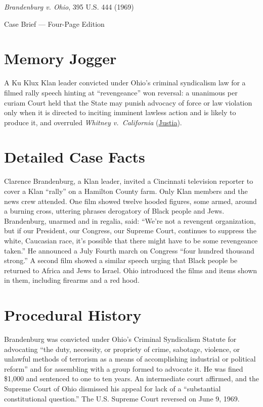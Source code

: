 \documentclass[12pt]{article}
\begin{document}
\begin{center}
{\LARGE \textit{Brandenburg v. Ohio}, 395 U.S. 444 (1969)\par}
\vspace{0.8em}
{\large Case Brief --- Four-Page Edition\par}
\end{center}
\vspace{1em}

\section{Memory Jogger}

A Ku Klux Klan leader convicted under Ohio's criminal syndicalism law for a filmed rally speech hinting at ``revengeance'' won reversal: a unanimous per curiam Court held that the State may punish advocacy of force or law violation only when it is directed to inciting imminent lawless action and is likely to produce it, and overruled \textit{Whitney v.\ California} (\href{https://supreme.justia.com/cases/federal/us/395/444/}{Justia}).

\section{Detailed Case Facts}

Clarence Brandenburg, a Klan leader, invited a Cincinnati television reporter to cover a Klan ``rally'' on a Hamilton County farm. Only Klan members and the news crew attended. One film showed twelve hooded figures, some armed, around a burning cross, uttering phrases derogatory of Black people and Jews. Brandenburg, unarmed and in regalia, said: ``We're not a revengent organization, but if our President, our Congress, our Supreme Court, continues to suppress the white, Caucasian race, it's possible that there might have to be some revengeance taken.'' He announced a July Fourth march on Congress ``four hundred thousand strong.'' A second film showed a similar speech urging that Black people be returned to Africa and Jews to Israel. Ohio introduced the films and items shown in them, including firearms and a red hood.

\section{Procedural History}

Brandenburg was convicted under Ohio's Criminal Syndicalism Statute for advocating ``the duty, necessity, or propriety of crime, sabotage, violence, or unlawful methods of terrorism as a means of accomplishing industrial or political reform'' and for assembling with a group formed to advocate it. He was fined \$1,000 and sentenced to one to ten years. An intermediate court affirmed, and the Supreme Court of Ohio dismissed his appeal for lack of a ``substantial constitutional question.'' The U.S. Supreme Court reversed on June 9, 1969.
\end{document}
